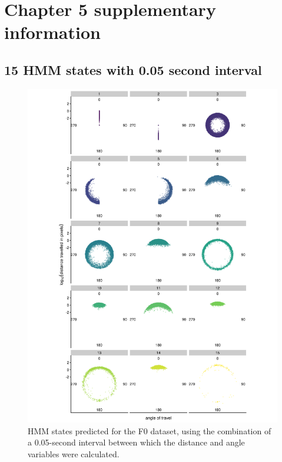 \documentclass[
]{book}
\begin{document}
\hypertarget{chapter-5-supplementary-information}{%
\chapter{Chapter 5 supplementary information}\label{chapter-5-supplementary-information}}

\hypertarget{hmm-states-with-0.05-second-interval}{%
\section{15 HMM states with 0.05 second interval}\label{hmm-states-with-0.05-second-interval}}



\begin{figure}
\includegraphics[width=1\linewidth]{figs/mikk_behaviour/0.05_15_polar_all_dge} \caption{HMM states predicted for the F0 dataset, using the combination of a 0.05-second interval between which the distance and angle variables were calculated.}\label{fig:hmm-states-05}
\end{figure}
\end{document}
